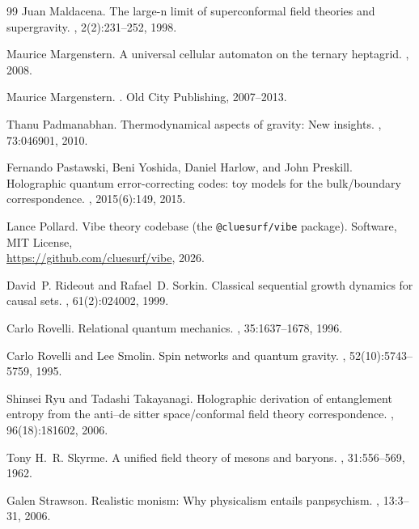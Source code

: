 \begin{thebibliography}{99}
Juan Maldacena.
\newblock The large-n limit of superconformal field theories and supergravity.
,
  2(2):231--252, 1998.

Maurice Margenstern.
\newblock A universal cellular automaton on the ternary heptagrid.
, 2008.

Maurice Margenstern.
.
\newblock Old City Publishing, 2007--2013.

Thanu Padmanabhan.
\newblock Thermodynamical aspects of gravity: New insights.
, 73:046901, 2010.

Fernando Pastawski, Beni Yoshida, Daniel Harlow, and John Preskill.
\newblock Holographic quantum error-correcting codes: toy models for the
  bulk/boundary correspondence.
, 2015(6):149, 2015.

Lance Pollard.
\newblock Vibe theory codebase (the \texttt{@cluesurf/vibe} package).
\newblock Software, MIT License,\\ \url{https://github.com/cluesurf/vibe},
  2026.

David~P. Rideout and Rafael~D. Sorkin.
\newblock Classical sequential growth dynamics for causal sets.
, 61(2):024002, 1999.

Carlo Rovelli.
\newblock Relational quantum mechanics.
, 35:1637--1678,
  1996.

Carlo Rovelli and Lee Smolin.
\newblock Spin networks and quantum gravity.
, 52(10):5743--5759, 1995.

Shinsei Ryu and Tadashi Takayanagi.
\newblock Holographic derivation of entanglement entropy from the anti--de
  sitter space/conformal field theory correspondence.
, 96(18):181602, 2006.

Tony H.~R. Skyrme.
\newblock A unified field theory of mesons and baryons.
, 31:556--569, 1962.

Galen Strawson.
\newblock Realistic monism: Why physicalism entails panpsychism.
, 13:3--31, 2006.


\end{thebibliography}
